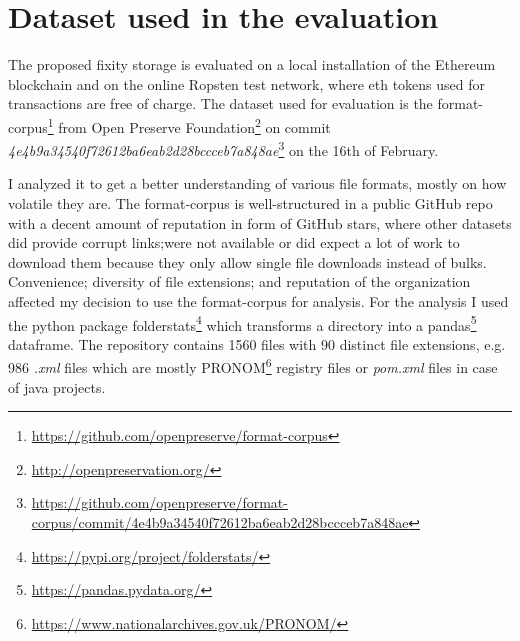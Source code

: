 \section{Dataset used in the evaluation}
The proposed fixity storage is evaluated on a local installation of the Ethereum blockchain and on the online Ropsten test network, where \acrshort{eth} tokens used for transactions are free of charge. The dataset used for evaluation is the format-corpus\footnote{\url{https://github.com/openpreserve/format-corpus}} from Open Preserve Foundation\footnote{\url{ http://openpreservation.org/}} on commit \textit{4e4b9a34540f72612ba6eab2d28bccceb7a848ae}\footnote{\url{https://github.com/openpreserve/format-corpus/commit/4e4b9a34540f72612ba6eab2d28bccceb7a848ae}} on the 16th of February.

I analyzed it to get a better understanding of various file formats, mostly on how volatile they are. The format-corpus is well-structured in a public GitHub repo with a decent amount of reputation in form of GitHub stars, where other datasets did provide corrupt links;were not available or did expect a lot of work to download them because they only allow single file downloads instead of bulks. Convenience; diversity of file extensions; and reputation of the organization affected my decision to use the format-corpus for analysis.
For the analysis I used the python package folderstats\footnote{\url{https://pypi.org/project/folderstats/}} which transforms a directory into a pandas\footnote{\url{https://pandas.pydata.org/}} dataframe. The repository contains 1560 files with 90 distinct file extensions, e.g. 986 \textit{.xml} files which are mostly PRONOM\footnote{\url{https://www.nationalarchives.gov.uk/PRONOM/}} registry files or \textit{pom.xml} files in case of java projects. 

